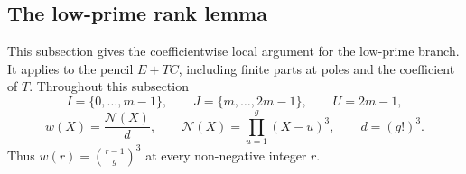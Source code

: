 
\subsection{The low-prime rank lemma}
\label{sec:insert-low-prime-rank}

This subsection gives the coefficientwise local argument for the low-prime
branch. It applies to the pencil $E+TC$, including finite parts at poles and
the coefficient of $T$.
Throughout this subsection
\[
 I=\{0,\ldots,m-1\},\qquad J=\{m,\ldots,2m-1\},\qquad U=2m-1,
\]
\[
 w(X)=\frac{\mathcal N(X)}d,\qquad
 \mathcal N(X)=\prod_{u=1}^{g}(X-u)^3,\qquad d=(g!)^3.
\]
Thus $w(r)=\binom{r-1}{g}^{3}$ at every non-negative integer $r$.

